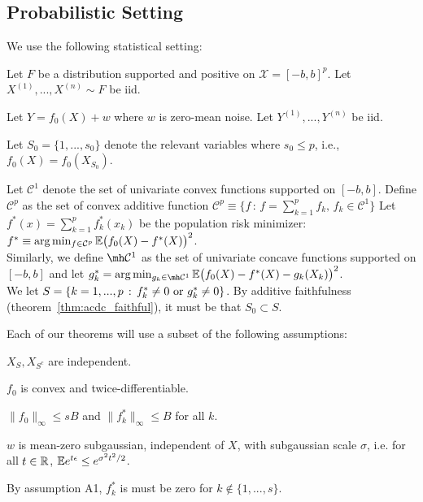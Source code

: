 \subsection{Probabilistic Setting}

We use the following statistical setting:

\begin{packed_enum}
\item Let $F$ be a distribution supported and positive on $\mathcal{X}=[-b,b]^p$. Let $X^{(1)},..., X^{(n)} \sim F$ be iid.
\item Let $Y = f_0(X) + w$ where $w$ is zero-mean noise. Let $Y^{(1)},...,Y^{(n)}$ be iid.
\item Let $S_0 = \{1,...,s_0\}$ denote the relevant variables where $s_0 \leq p$, i.e.,
  $f_0(X) = f_0(X_{S_0})$.
\end{packed_enum}


Let $\mathcal{C}^1$ denote the set of univariate convex functions supported on $[-b,b]$. Define $\mathcal{C}^{p}$ as the set of convex additive function
$\mathcal{C}^p \equiv \{ f \,:\, f = \sum_{k=1}^p f_k, \,
   f_k \in \mathcal{C}^1 \} $
Let $f^*(x) = \sum_{k=1}^p f^*_k(x_k)$ be the population risk minimizer:
$f^* \equiv \arg\min_{f \in \mathcal{C}^p} {\mathbb E}\big(f_0(X) - f^*(X) \big)^2$.\\

Similarly, we define $\mh \mathcal{C}^1$ as the set of univariate concave functions supported on $[-b, b]$ and let 
$g^*_k = \arg\min_{g_k \in \mh \mathcal{C}^1} \E \big( f_0(X) - f^*(X) - g_k(X_k) \big)^2$. \\

We let $S = \{ k = 1,...,p \,:\, f^*_k \neq 0 \textrm{ or } g^*_k \neq 0\}$. By additive faithfulness (theorem~\ref{thm:acdc_faithful}), it must be that $S_0 \subset S$. 


Each of our theorems will use a subset of the following assumptions:
\begin{packed_enum}
\item[A1:] $X_S, X_{S^c}$ are independent. 
\item[A2:] $f_0$ is convex and twice-differentiable. 
\item[A3:] $\|f_0\|_\infty \leq sB$ and $\| f^*_k \|_\infty \leq B$ for all $k$.
\item[A4:] $w$ is mean-zero subgaussian, independent of $X$, with subgaussian scale $\sigma$, i.e. for all $t \in {\mathbb R}$, ${\mathbb E} e^{t \epsilon} \leq e^{\sigma^2 t^2 / 2}$.
\end{packed_enum}
By assumption A1, $f^*_k$ is must be zero for $k\notin \{1,...,s\}$. 


